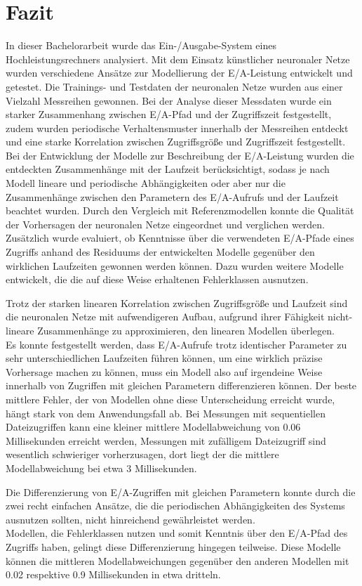 \documentclass[
	12pt,
	a4paper,
	BCOR10mm,
	DIV14,
	listof=totoc,
	bibliography=totoc,
	headsepline
]{scrreprt}
\begin{document}
\chapter{Fazit}
\label{Fazit}
In dieser Bachelorarbeit wurde das Ein-/Ausgabe-System eines Hochleistungsrechners analysiert.
Mit dem Einsatz künstlicher neuronaler Netze wurden verschiedene Ansätze zur Modellierung der E/A-Leistung entwickelt und getestet.
Die Trainings- und Testdaten der neuronalen Netze wurden aus einer Vielzahl Messreihen gewonnen. Bei der Analyse dieser Messdaten wurde ein starker Zusammenhang zwischen E/A-Pfad und der Zugriffszeit festgestellt, zudem wurden periodische Verhaltensmuster innerhalb der Messreihen entdeckt und eine starke Korrelation zwischen Zugriffsgröße und Zugriffszeit festgestellt.
Bei der Entwicklung der Modelle zur Beschreibung der E/A-Leistung wurden die entdeckten Zusammenhänge mit der Laufzeit berücksichtigt, sodass je nach Modell lineare und periodische Abhängigkeiten oder aber nur die Zusammenhänge zwischen den Parametern des E/A-Aufrufs und der Laufzeit beachtet wurden.
Durch den Vergleich mit Referenzmodellen konnte die Qualität der Vorhersagen der neuronalen Netze eingeordnet und verglichen werden.
Zusätzlich wurde evaluiert, ob Kenntnisse über die verwendeten E/A-Pfade eines Zugriffs anhand des Residuums der entwickelten Modelle gegenüber den wirklichen Laufzeiten gewonnen werden können.
Dazu wurden weitere Modelle entwickelt, die die auf diese Weise erhaltenen Fehlerklassen ausnutzen.\medskip

Trotz der starken linearen Korrelation zwischen Zugriffsgröße und Laufzeit sind die neuronalen Netze mit aufwendigeren Aufbau, aufgrund ihrer Fähigkeit nicht-lineare Zusammenhänge zu approximieren, den linearen Modellen überlegen.\\
Es konnte festgestellt werden, dass E/A-Aufrufe trotz identischer Parameter zu sehr unterschiedlichen Laufzeiten führen können, um eine wirklich präzise Vorhersage machen zu können, muss ein Modell also auf irgendeine Weise innerhalb von Zugriffen mit gleichen Parametern differenzieren können.
Der beste mittlere Fehler, der von Modellen ohne diese Unterscheidung erreicht wurde, hängt stark von dem Anwendungsfall ab.
Bei Messungen mit sequentiellen Dateizugriffen kann eine kleiner mittlere Modellabweichung von 0.06 Millisekunden erreicht werden, Messungen mit zufälligem Dateizugriff sind wesentlich schwieriger vorherzusagen, dort liegt der die mittlere Modellabweichung bei etwa 3 Millisekunden.\medskip

Die Differenzierung von E/A-Zugriffen mit gleichen Parametern konnte durch die zwei recht einfachen Ansätze, die die periodischen Abhängigkeiten des Systems ausnutzen sollten, nicht hinreichend gewährleistet werden.\\
Modellen, die Fehlerklassen nutzen und somit Kenntnis über den E/A-Pfad des Zugriffs haben, gelingt diese Differenzierung hingegen teilweise.
Diese Modelle können die mittleren Modellabweichungen gegenüber den anderen Modellen mit 0.02 respektive 0.9 Millisekunden in etwa dritteln.\medskip
\end{document}
